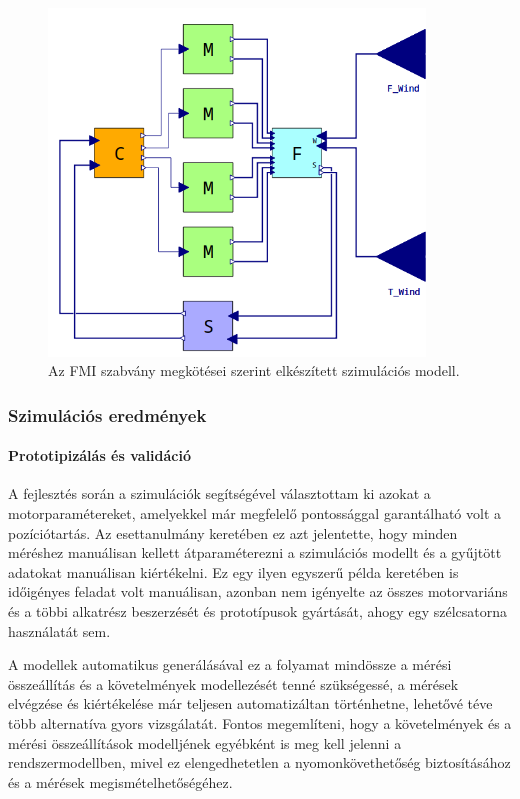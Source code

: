         \begin{figure}[!ht]
            \centering
            \includegraphics[width=100mm, keepaspectratio]{figures/fmiSzim.png}
            \caption{Az FMI szabvány megkötései szerint elkészített szimulációs modell.} 
            \label{fig:fmiSzim}
        \end{figure}

        \subsubsection{Szimulációs eredmények}
            \paragraph{Prototipizálás és validáció}
            A fejlesztés során a szimulációk segítségével választottam ki azokat a motorparamétereket, amelyekkel már megfelelő pontossággal garantálható volt a pozíciótartás.
            Az esettanulmány keretében ez azt jelentette, hogy minden méréshez manuálisan kellett átparaméterezni a szimulációs modellt és a gyűjtött adatokat manuálisan kiértékelni. Ez egy ilyen egyszerű példa keretében is időigényes feladat volt manuálisan, azonban nem igényelte  az összes motorvariáns és a többi alkatrész beszerzését és prototípusok gyártását, ahogy egy szélcsatorna használatát sem.

            A modellek automatikus generálásával ez a folyamat mindössze a mérési összeállítás és a követelmények modellezését tenné szükségessé, a mérések elvégzése és kiértékelése már teljesen automatizáltan történhetne, lehetővé téve több alternatíva gyors vizsgálatát.
            Fontos megemlíteni, hogy a követelmények és a mérési összeállítások modelljének egyébként is meg kell jelenni a rendszermodellben, mivel ez elengedhetetlen a nyomonkövethetőség biztosításához és a mérések megismételhetőségéhez.

